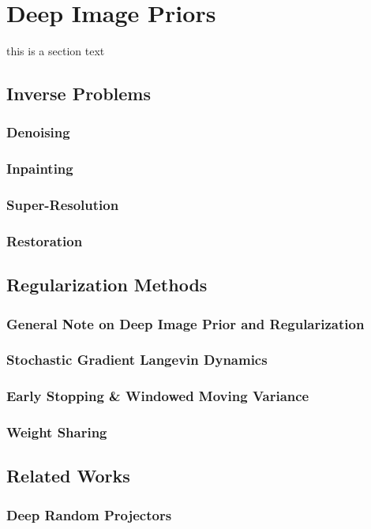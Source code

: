 \section{Deep Image Priors}
this is a section text

\subsection{Inverse Problems}
\subsubsection{Denoising}
\subsubsection{Inpainting}
\subsubsection{Super-Resolution}
\subsubsection{Restoration}

\subsection{Regularization Methods}
\subsubsection{General Note on Deep Image Prior and Regularization}
\subsubsection{Stochastic Gradient Langevin Dynamics}

\subsubsection{Early Stopping \& Windowed Moving Variance}

\subsubsection{Weight Sharing}

\subsection{Related Works}
\subsubsection{Deep Random Projectors}
